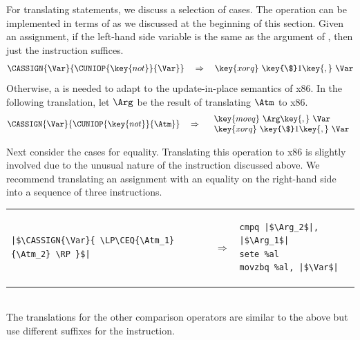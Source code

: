 \documentclass[7x10,nocrop]{TimesAPriori_MIT}%
\begin{document}
For translating statements, we discuss a selection of cases.  The 
operation can be implemented in terms of  as we discussed
at the beginning of this section. Given an assignment, if the
left-hand side variable is the same as the argument of ,
then just the  instruction suffices.
\[
\CASSIGN{\Var}{ \CUNIOP{\key{not}}{\Var} }
\quad\Rightarrow\quad
\key{xorq}~\key{\$}1\key{,}~\Var
\]
Otherwise, a  is needed to adapt to the update-in-place
semantics of x86. In the following translation, let $\Arg$ be the
result of translating $\Atm$ to x86.
\[
\CASSIGN{\Var}{ \CUNIOP{\key{not}}{\Atm} }
\quad\Rightarrow\quad
\begin{array}{l}
\key{movq}~\Arg\key{,}~\Var\\
\key{xorq}~\key{\$}1\key{,}~\Var
\end{array}
\]

Next consider the cases for equality.  Translating this operation to
x86 is slightly involved due to the unusual nature of the 
instruction discussed above.  We recommend translating an assignment
with an equality on the right-hand side into a sequence of three
instructions. \\
\begin{tabular}{lll}
\begin{minipage}{0.4\textwidth}
\begin{lstlisting}
|$\CASSIGN{\Var}{ \LP\CEQ{\Atm_1}{\Atm_2} \RP }$|
\end{lstlisting}
\end{minipage}
&
$\Rightarrow$
&
\begin{minipage}{0.4\textwidth}
\begin{lstlisting}
cmpq |$\Arg_2$|, |$\Arg_1$|
sete %al
movzbq %al, |$\Var$|
\end{lstlisting}
\end{minipage}
\end{tabular}  \\
The translations for the other comparison operators are similar to the
above but use different suffixes for the  instruction.
\end{document}
